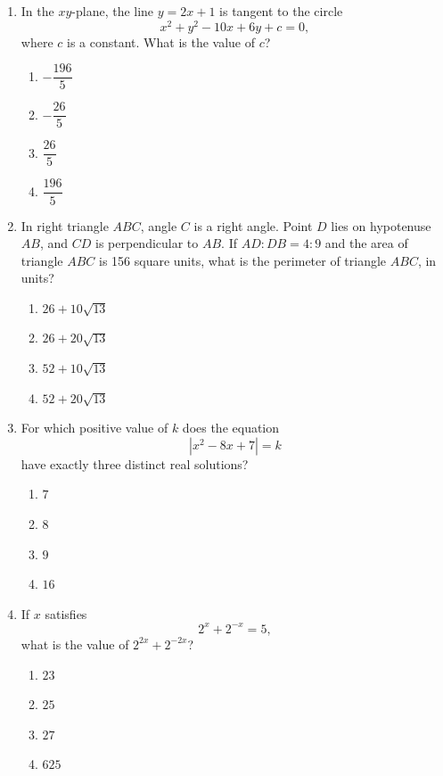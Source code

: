 \documentclass[12pt]{article}
\begin{document}
\begin{enumerate}[leftmargin=*,itemsep=1em]
  \vfill
  \item In the $xy$-plane, the line $y=2x+1$ is tangent to the circle
  \[
    x^2+y^2-10x+6y+c=0,
  \]
  where $c$ is a constant. What is the value of $c$?
  \begin{enumerate}[label=\Alph*.,itemsep=0pt]
    \item $-\dfrac{196}{5}$ \item $-\dfrac{26}{5}$
    \item $\dfrac{26}{5}$ \item $\dfrac{196}{5}$
  \end{enumerate}

  \vfill
  \newpage
  \item In right triangle $ABC$, angle $C$ is a right angle. Point $D$ lies on hypotenuse $AB$, and $CD$ is perpendicular to $AB$. If $AD:DB=4:9$ and the area of triangle $ABC$ is 156 square units, what is the perimeter of triangle $ABC$, in units?
  \begin{enumerate}[label=\Alph*.,itemsep=0pt]
    \item $26+10\sqrt{13}$
    \item $26+20\sqrt{13}$
    \item $52+10\sqrt{13}$
    \item $52+20\sqrt{13}$
  \end{enumerate}

  \vfill
  \item For which positive value of $k$ does the equation
  \[
    \left|x^2-8x+7\right|=k
  \]
  have exactly three distinct real solutions?
  \begin{enumerate}[label=\Alph*.,itemsep=0pt]
    \item $7$ \item $8$ \item $9$ \item $16$
  \end{enumerate}

  \vfill
  \item If $x$ satisfies
  \[
    2^x+2^{-x}=5,
  \]
  what is the value of $2^{2x}+2^{-2x}$?
  \begin{enumerate}[label=\Alph*.,itemsep=0pt]
    \item $23$ \item $25$ \item $27$ \item $625$
  \end{enumerate}
  \vfill
\end{enumerate}
\end{document}
